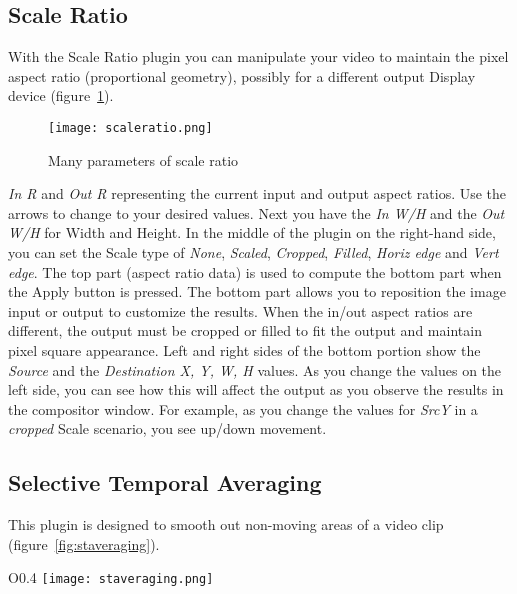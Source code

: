 \subsection{Scale Ratio}%
\label{sub:scale_ratio}

With the Scale Ratio plugin you can manipulate your video to maintain the pixel aspect ratio (proportional geometry), possibly for a different output Display device (figure~\ref{fig:scaleratio}).

\begin{figure}[hbtp]
    \centering
    \texttt{[image: scaleratio.png]}
    \caption{Many parameters of scale ratio}
    \label{fig:scaleratio}
\end{figure}

\textit{In R} and \textit{Out R} representing the current input and output aspect ratios. Use the arrows to change to your desired values. Next you have the \textit{In W/H} and the \textit{Out W/H} for Width and Height. In the middle of the plugin on the right-hand side, you can set the Scale type of \textit{None}, \textit{Scaled}, \textit{Cropped}, \textit{Filled}, \textit{Horiz edge} and \textit{Vert edge}. The top part (aspect ratio data) is used to compute the bottom part when the Apply button is pressed. The bottom part allows you to reposition the image input or output to customize the results. When the in/out aspect ratios are different, the output must be cropped or filled to fit the output and maintain pixel square appearance. Left and right sides of the bottom portion show the \textit{Source} and the \textit{Destination X, Y, W, H} values. As you change the values on the left side, you can see how this will affect the output as you observe the results in the compositor window. For example, as you change the values for \textit{SrcY} in a \textit{cropped} Scale scenario, you see up/down movement.

\subsection{Selective Temporal Averaging}%
\label{sub:selective_temporal_averaging}

This plugin is designed to smooth out non-moving areas of a video clip (figure~\ref{fig:staveraging}).
\vspace{2ex}
\begin{wrapfigure}[18]{O}{0.4\linewidth}
   \vspace{-2ex}
    \texttt{[image: staveraging.png]}
    \caption{STA control window}
    \label{fig:staveraging}
\end{wrapfigure}

